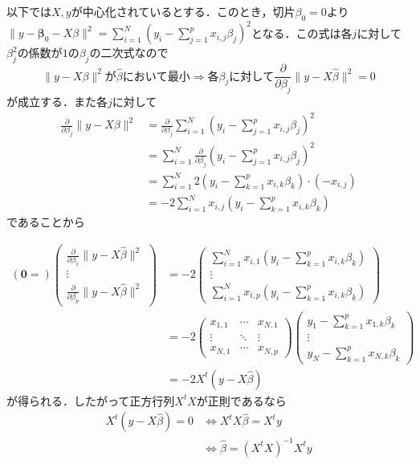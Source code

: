 \documentclass{jsarticle}
\theoremstyle{definition}
\begin{document}
以下では$X,y$が中心化されているとする．このとき，切片$\beta_0=0$より$\|y -{\bm \beta}_0-X\beta\|^2=\sum_{i=1}^N (y_i-\sum_{j=1}^p x_{i,j}\beta_j)^2$となる．この式は各$j$に対して$\beta_j^2$の係数が$1$の$\beta_j$の二次式なので
$$\|y -X\beta\|^2が\hat{\beta}において最小\Rightarrow 各\beta_jに対して\frac{\partial}{\partial \beta_j}\|y-X\hat{\beta}\|^2=0$$
が成立する．また各$j$に対して
\begin{align*}
\frac{\partial}{\partial \beta_j}\|y-X\beta\|^2&=\frac{\partial}{\partial \beta_j}\sum_{i=1}^N \left(y_i-\sum_{j=1}^p x_{i,j}\beta_j\right)^2\\
&=\sum_{i=1}^N\frac{\partial}{\partial \beta_j} \left(y_i-\sum_{j=1}^p x_{i,j}\beta_j\right)^2\\
&=\sum_{i=1}^N 2\left(y_i-\sum_{k=1}^p x_{i,k}\beta_k\right)\cdot (-x_{i,j})\\
&=-2\sum_{i=1}^N x_{i,j}\left(y_i-\sum_{k=1}^p x_{i,k}\beta_k\right)
\end{align*}
であることから



\begin{align*}
({\bm 0}=)\left(\begin{array}{c}
\frac{\partial}{\partial \beta_1}\|y-X\hat{\beta}\|^2\\
\vdots\\
\frac{\partial}{\partial \beta_p}\|y-X\hat{\beta}\|^2
\end{array}\right)&=-2\left(\begin{array}{c}
\sum_{i=1}^N x_{i,1}\left(y_i-\sum_{k=1}^p x_{i,k}\beta_k\right)\\
\vdots\\
\sum_{i=1}^N x_{i,p}\left(y_i-\sum_{k=1}^p x_{i,k}\beta_k\right)
\end{array}\right)\\
&=-2\begin{pmatrix}
x_{1,1}& \cdots & x_{N,1}\\
\vdots & \ddots & \vdots\\
x_{N,1} & \cdots & x_{N,p}
\end{pmatrix}\left(\begin{array}{c}
y_1-\sum_{k=1}^p x_{1,k}\beta_k\\
\vdots\\
y_N-\sum_{k=1}^p x_{N,k}\beta_k\end{array}\right)\\
&=-2X^t(y-X\hat{\beta})
\end{align*}
が得られる．したがって正方行列$X^tX$が正則であるなら
\begin{align*}
X^t(y-X\hat{\beta})=0&\Leftrightarrow X^tX\hat{\beta}=X^t y\\
&\Leftrightarrow \hat{\beta}=(X^tX)^{-1}X^t y
\end{align*}
\end{document}
